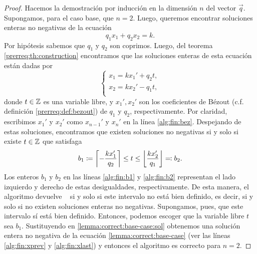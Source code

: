 \begin{proof}
	Hacemos la demostración por inducción en la dimensión $n$ del vector $\vec{q}$. Supongamos, para
	el caso base, que $n = 2$. Luego, queremos encontrar soluciones enteras no negativas de la
	ecuación
	\begin{equation}
		\label{lemma:correct:base-case}
		q_1x_1 + q_2x_2 = k.
	\end{equation}
	Por hipótesis sabemos que $q_1$ y $q_2$ son coprimos. Luego, del teorema
	\ref{prerreq:th:construction} encontramos que las soluciones enteras de esta ecuación están
	dadas por
	\begin{equation}
		\label{lemma:correct:base-case:sol}
		\begin{cases}
			x_1 = kx_1' + q_2t, \\
			x_2 = kx_2' - q_1t, \\
		\end{cases}
	\end{equation}
	donde $t \in \mathbb{Z}$ es una variable libre, y $x_1', x_2'$ son los coeficientes de Bézout (c.f.
	definición \ref{prerreq:def:bezout}) de $q_1$ y $q_2$, respectivamente. Por claridad, escribimos
	$x_1'$ y $x_2'$ como $x_{n-1}'$ y $x_{n}'$ en la línea \ref{alg:fin:bez}. Despejando de estas
	soluciones, encontramos que existen soluciones no negativas si y solo si existe $t \in \mathbb{Z}$ que
	satisfaga
	\begin{equation*}
		b_1 \coloneq \left\lceil -\frac{kx_1'}{q_2} \right\rceil \leq t \leq \left\lfloor \frac{kx_2'}{q_1} \right\rfloor \eqcolon b_2.
	\end{equation*}
	Los enteros $b_1$ y $b_2$ en las líneas \ref{alg:fin:b1} y \ref{alg:fin:b2} representan el
	lado izquierdo y derecho de estas desigualdades, respectivamente. De esta manera, el algoritmo
	devuelve \NIL~ si y solo si este intervalo no está bien definido, es decir, si y solo si no existen
	soluciones enteras no negativas. Supongamos, pues, que este intervalo sí está bien definido.
	Entonces, podemos escoger que la variable libre $t$ sea $b_1$. Sustituyendo en
	\eqref{lemma:correct:base-case:sol} obtenemos una solución entera no negativa de la ecuación
	\eqref{lemma:correct:base-case} (ver las líneas \ref{alg:fin:xprev} y \ref{alg:fin:xlast}) y entonces
	el algoritmo es correcto para $n = 2$.


\end{proof}
